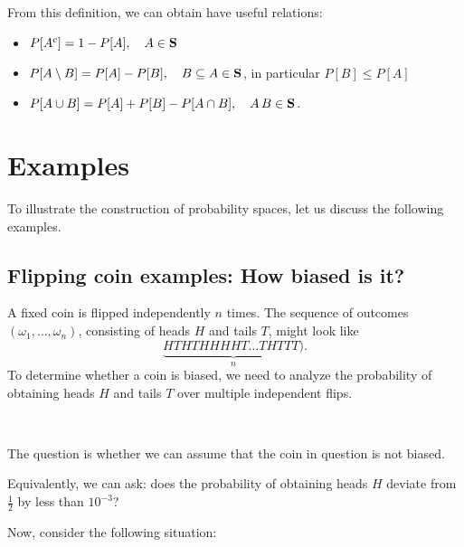 From this definition, we can obtain have  useful relations:
\begin{itemize}
 \item $P[A^c] = 1-P[A], \quad A\in {\mathbf{S}}$
\item  $P[A\setminus B] = P[A] -P[B], \quad B\subseteq A \in {\mathbf{S}}$, in
particular $P[B] \leq P[A]$
\item  $P[A\cup B] =P[A] +P[B]-P[A\cap B],\quad A\, B \in {\mathbf{S}}$.
\end{itemize}

\section{Examples}
To  illustrate the  construction of probability spaces, let us discuss the following examples.

\subsection{Flipping coin examples: How biased is it?}
\begin{example}
    A fixed coin is flipped independently  $n$ times. The sequence of outcomes  
  $(\omega_1, \dots, \omega_n)$, consisting of heads  $H$ and tails $T$, might look like \[\underbrace{HTHTHHHHT\ldots THTTT)}_{n}.\] To determine whether a coin is biased, we need to analyze the probability of obtaining heads $H$ and tails $T$ over multiple independent flips.

  \, 
  
  The question is whether we can assume that the coin in question is not biased.   
\, 

    Equivalently, we can ask: does the probability of obtaining heads  $H$ deviate from $\frac{1}{2}$ by less than $10^{-3}$?
\end{example}

Now, consider the following situation:

